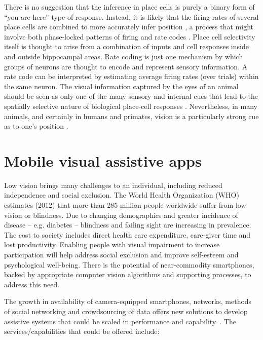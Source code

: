 There is no suggestion that the inference in place cells is purely a binary form of ``you are here'' type of response.  Instead, it is likely that the firing rates of several place cells are combined to more accurately infer position \cite{hafting2005microstructure}, a process that might involve both phase-locked patterns of firing and rate codes \cite{dragoi2006temporal}. Place cell selectivity itself is thought to arise from a combination of inputs and cell responses inside and outside hippocampal areas. Rate coding \cite{van2001rate} is just one mechanism by which groups of neurons are thought to encode and represent sensory information. A rate code can be interpreted by estimating average firing rates (over trials) within the same neuron. %
The visual information captured by the eyes of an animal should be seen as only one of the many sensory and internal cues that lead to the spatially selective nature of biological place-cell responses \cite{hassabis2009decoding}. Nevertheless, in many animals, and certainly in humans and primates, vision is a particularly strong cue as to one's position \cite{epstein1998cortical}.


\section{Mobile visual assistive apps}

Low vision brings many challenges to an individual, including reduced independence and social exclusion. The World Health Organization (WHO) estimates (2012) that more than 285 million people worldwide suffer from low vision or blindness. Due to changing demographics and greater incidence of disease -- e.g. diabetes -- blindness and failing sight are increasing in prevalence.  The cost to society includes direct health care expenditure, care-giver time and lost productivity.  Enabling people with visual impairment to increase participation will help address social exclusion and improve self-esteem and psychological well-being. There is the potential of near-commodity smartphones, backed by appropriate computer vision algorithms and supporting processes, to address this need.

The growth in availability of camera-equipped smartphones, networks, methods of social networking and crowdsourcing of data offers new solutions to develop assistive systems that could be scaled in performance and capability~\cite{Manduchi2012,Worsfold2010}. The services/capabilities that could be offered include:

